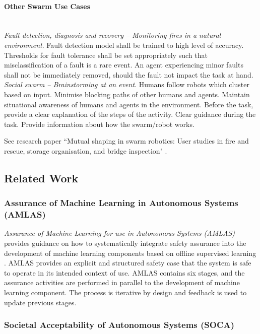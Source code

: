 \documentclass[lettersize,journal]{IEEEtran}
\begin{document}
\paragraph*{Other Swarm Use Cases}
\emph{\\Fault detection, diagnosis and recovery – Monitoring fires in a natural environment}. Fault detection model shall be trained to high level of accuracy. Thresholds for fault tolerance shall be set appropriately such that misclassification of a fault is a rare event. An agent experiencing minor faults shall not be immediately removed, should the fault not impact the task at hand. \\
\emph{\noindent Social swarm – Brainstorming at an event}. Humans follow robots which cluster based on input. Minimise blocking paths of other humans and agents. Maintain situational awareness of humans and agents in the environment. Before the task, provide a clear explanation of the steps of the activity. Clear guidance during the task. Provide information about how the swarm/robot works.

\noindent See research paper ``Mutual shaping in swarm robotics: User studies in fire and rescue, storage organisation, and bridge inspection" \cite{Carrillo-Zapata2020}.

\subsection{Related Work}\label{relatedwork}

\subsubsection{Assurance of Machine Learning in Autonomous Systems (AMLAS)}
\textit{Assurance of Machine Learning for use in Autonomous Systems (AMLAS)} provides guidance on how to systematically integrate safety assurance into the development of machine learning components based on offline supervised learning \cite{AMLAS2021}. 
AMLAS provides an explicit and structured safety case that the system is safe to operate in its intended context of use. 
AMLAS contains six stages, and the assurance activities are performed in parallel to the development of machine learning component. 
The process is iterative by design and feedback is used to update previous stages. 

\subsubsection{Societal Acceptability of Autonomous Systems (SOCA)}
\cite{Porter2022,McDermid2021}
\end{document}
